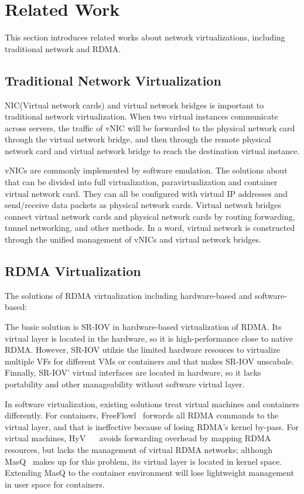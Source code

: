 \section{Related Work}
This section introduces related works about network virtualizations, including traditional network and RDMA.

\subsection{Traditional Network Virtualization}
NIC(Virtual network cards) and virtual network bridges is important to traditional network virtualization. When two virtual instances communicate across servers, the traffic of vNIC will be forwarded to the physical network card through the virtual network bridge, and then through the remote physical network card and virtual network bridge to reach the destination virtual instance.

vNICs are commonly implemented by software emulation. The solutions about that can be divided into full virtualization, paravirtualization and container virtual network card. They can all be configured with virtual IP addresses and send/receive data packets as physical network cards. Virtual network bridges connect virtual network cards and physical network cards by routing forwarding, tunnel networking, and other methods. In a word, virtual network is constructed through the unified management of vNICs and virtual network bridges.

\subsection{RDMA Virtualization}
The solutions of RDMA virtualization including hardware-based  and software-based:

The basic solution is SR-IOV in hardware-based virtualization of RDMA. Its virtual layer is located in the hardware, so it is high-performance close to native RDMA. However, SR-IOV utilzie the limited hardware resouces to virtualize multiple VFs for different VMs or containers and that makes SR-IOV unscabale. Finnally, SR-IOV' virtual interfaces are located in hardware, so it lacks portability and other manageability without software virtual layer. 

In software virtualization, existing solutions treat virtual machines and containers differently. For containers, FreeFlowl~\cite{kim2019freeflow} forwards all RDMA commands to the virtual layer, and that is ineffective because of losing RDMA's kernel by-pass. For virtual machines, HyV~\cite{pfefferle2015hybrid} ~\cite{pfefferle2014vverbs} avoids forwarding overhead by mapping RDMA resources, but lacks the management of virtual RDMA networks; although MasQ~\cite{he2020masq} makes up for this problem, its virtual layer is located in kernel space. Extending MasQ to the container environment will lose lightweight  management in user space for containers.





